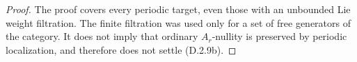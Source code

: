 \begin{proof}
The proof covers every periodic target, even those with an
unbounded Lie weight filtration. The finite filtration was
used only for a set of free generators of the category.
It does not imply that ordinary $A_r$-nullity is preserved
by periodic localization, and therefore does not settle
\textup{(D.2.9b)}.
\end{proof}
